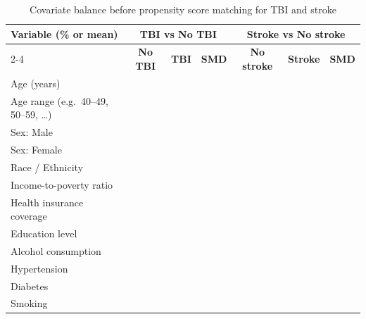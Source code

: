 \documentclass{article}
\begin{document}
\begin{table}[htbp]
\centering
\caption{Covariate balance before propensity score matching for TBI and stroke}
\label{tab:ps-balance-before}
\begin{tabular}{lcccccc}
\hline
\textbf{Variable (\% or mean)} &
\multicolumn{3}{c}{\textbf{TBI vs No TBI}} &
\multicolumn{3}{c}{\textbf{Stroke vs No stroke}} \\
\cline{2-4} \cline{5-7}
 & \textbf{No TBI} & \textbf{TBI} & \textbf{SMD} &
   \textbf{No stroke} & \textbf{Stroke} & \textbf{SMD} \\
\hline
Age (years) & & & & & & \\
Age range (e.g.\ 40--49, 50--59, \dots) & & & & & & \\
Sex: Male & & & & & & \\
Sex: Female & & & & & & \\
Race / Ethnicity & & & & & & \\
Income-to-poverty ratio & & & & & & \\
Health insurance coverage & & & & & & \\
Education level & & & & & & \\
Alcohol consumption & & & & & & \\
Hypertension & & & & & & \\
Diabetes & & & & & & \\
Smoking & & & & & & \\
\hline
\end{tabular}
\end{table}
\end{document}
